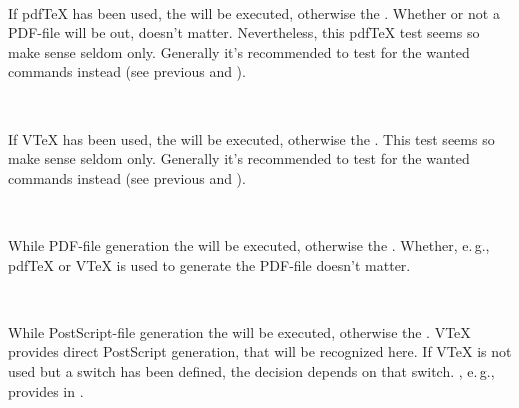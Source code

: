 \begin{Declaration}
  \\
\end{Declaration}
%
%
If pdf\TeX{} has been used, the  will be executed,
otherwise the . Whether or not a PDF-file will be
out, doesn't matter. Nevertheless, this pdf\TeX{} test seems so make sense
seldom only. Generally it's recommended to test for the wanted commands
instead (see previous  and
).
%
%
%


\begin{Declaration}
  \\
\end{Declaration}
%
%
If V\TeX{} has been used, the  will be executed,
otherwise the . This test seems so make sense
seldom only. Generally it's recommended to test for the wanted commands instead
(see previous  and ).
%
%
%


\begin{Declaration}
  \\
\end{Declaration}
%
%
While PDF-file generation the  will be executed,
otherwise the . Whether, e.\,g., pdf\TeX{} or V\TeX{}
is used to generate the PDF-file doesn't matter.
%
%
%


\begin{Declaration}
  \\
\end{Declaration}
%
%
While PostScript-file generation the  will be executed,
otherwise the . V\TeX{} provides direct PostScript
generation, that will be recognized here. If V\TeX{} is not used but a switch
 has been defined, the decision depends on that
switch. \KOMAScript{}, e.\,g., provides  in
.
%
%
%


